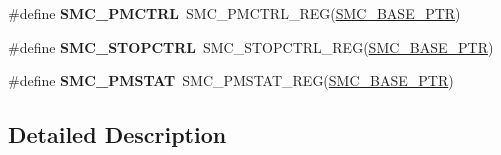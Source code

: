 \begin{DoxyCompactItemize}
\item 
\hypertarget{group___s_m_c___register___accessor___macros_ga4b2bae0309aecee21e9fe70ac7dbe3dc}{}\#define {\bfseries S\+M\+C\+\_\+\+P\+M\+C\+T\+R\+L}~S\+M\+C\+\_\+\+P\+M\+C\+T\+R\+L\+\_\+\+R\+E\+G(\hyperlink{group___s_m_c___peripheral_ga31b6c4571795341e6446800243313e56}{S\+M\+C\+\_\+\+B\+A\+S\+E\+\_\+\+P\+T\+R})\label{group___s_m_c___register___accessor___macros_ga4b2bae0309aecee21e9fe70ac7dbe3dc}

\item 
\hypertarget{group___s_m_c___register___accessor___macros_ga30413a73d6f7e296acd7d1857ebf213e}{}\#define {\bfseries S\+M\+C\+\_\+\+S\+T\+O\+P\+C\+T\+R\+L}~S\+M\+C\+\_\+\+S\+T\+O\+P\+C\+T\+R\+L\+\_\+\+R\+E\+G(\hyperlink{group___s_m_c___peripheral_ga31b6c4571795341e6446800243313e56}{S\+M\+C\+\_\+\+B\+A\+S\+E\+\_\+\+P\+T\+R})\label{group___s_m_c___register___accessor___macros_ga30413a73d6f7e296acd7d1857ebf213e}

\item 
\hypertarget{group___s_m_c___register___accessor___macros_ga6311e0572e3a1f7d84e1069716b64307}{}\#define {\bfseries S\+M\+C\+\_\+\+P\+M\+S\+T\+A\+T}~S\+M\+C\+\_\+\+P\+M\+S\+T\+A\+T\+\_\+\+R\+E\+G(\hyperlink{group___s_m_c___peripheral_ga31b6c4571795341e6446800243313e56}{S\+M\+C\+\_\+\+B\+A\+S\+E\+\_\+\+P\+T\+R})\label{group___s_m_c___register___accessor___macros_ga6311e0572e3a1f7d84e1069716b64307}

\end{DoxyCompactItemize}


\subsection{Detailed Description}
